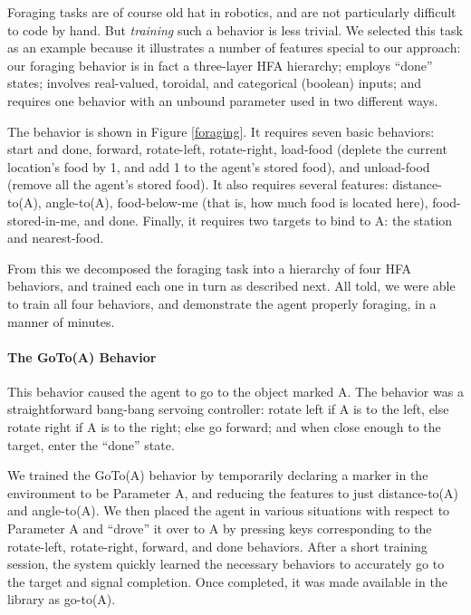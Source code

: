 



Foraging tasks are of course old hat in robotics, and are not particularly difficult to code by hand.  But {\it training} such a behavior is less trivial.  We selected this task as an example because it illustrates a number of features special to our approach: our foraging behavior is in fact a three-layer HFA hierarchy; employs ``done'' states; involves real-valued, toroidal, and categorical (boolean) inputs; and requires one behavior with an unbound parameter used in two different ways.

The behavior is shown in Figure \ref{foraging}.  It requires seven basic behaviors: \textsf{start} and \textsf{done},  \textsf{forward}, \textsf{rotate-left}, \textsf{rotate-right}, \textsf{load-food} (deplete the current location's food by 1, and add 1 to the agent's stored food), and \textsf{unload-food} (remove all the agent's stored food).  It also requires several features: \textsf{distance-to(A)}, \textsf{angle-to(A)}, \textsf{food-below-me} (that is, how much food is located here), \textsf{food-stored-in-me}, and \textsf{done}.  Finally, it requires two targets to bind to A: the \textsf{station} and \textsf{nearest-food}.  

From this we decomposed the foraging task into a hierarchy of four HFA behaviors, and trained each one in turn as described next.  All told, we were able to train all four behaviors, and demonstrate the agent properly foraging, in a manner of minutes.

\paragraph*{The GoTo(A) Behavior} This behavior caused the agent to go to the object marked A.  The behavior was a straightforward bang-bang servoing controller: rotate left if A is to the left, else rotate right if A is to the right; else go forward; and when close enough to the target, enter the ``done'' state.
 
We trained the GoTo(A) behavior by temporarily declaring a marker in the environment to be Parameter A, and reducing the features to just \textsf{distance-to(A)} and \textsf{angle-to(A)}.  We then placed the agent in various situations with respect to Parameter A and ``drove'' it over to A by pressing keys corresponding to the \textsf{rotate-left}, \textsf{rotate-right}, \textsf{forward}, and \textsf{done} behaviors.  After a short training session, the system quickly learned the necessary behaviors to accurately go to the target and signal completion.  Once completed, it was made available in the library as \textsf{go-to(A)}.

